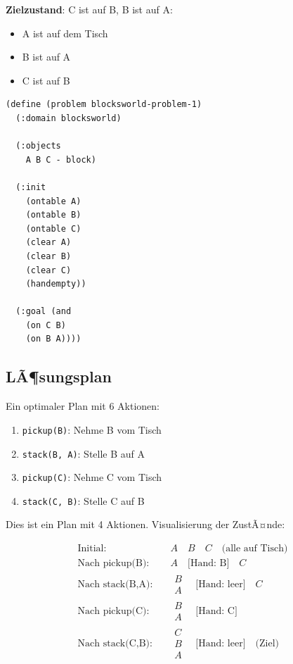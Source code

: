 ﻿\documentclass[a4paper,12pt]{article}
\theoremstyle{definition}
\begin{document}
\textbf{Zielzustand}: C ist auf B, B ist auf A:
\begin{itemize}
	\item[-] A ist auf dem Tisch
	\item[-] B ist auf A
	\item[-] C ist auf B
\end{itemize}

\begin{lstlisting}[language=PDDL, caption=Blocksworld Problem]
(define (problem blocksworld-problem-1)
  (:domain blocksworld)
  
  (:objects
    A B C - block)
  
  (:init
    (ontable A)
    (ontable B)
    (ontable C)
    (clear A)
    (clear B)
    (clear C)
    (handempty))
  
  (:goal (and
    (on C B)
    (on B A))))
\end{lstlisting}

\subsection{LÃ¶sungsplan}

Ein optimaler Plan mit 6 Aktionen:

\begin{enumerate}
	\item \texttt{pickup(B)}: Nehme B vom Tisch
	\item \texttt{stack(B, A)}: Stelle B auf A
	\item \texttt{pickup(C)}: Nehme C vom Tisch
	\item \texttt{stack(C, B)}: Stelle C auf B
\end{enumerate}

Dies ist ein Plan mit 4 Aktionen. Visualisierung der ZustÃ¤nde:

\begin{align*}
\text{Initial:} \quad & A \quad B \quad C \quad \text{(alle auf Tisch)} \\
\text{Nach pickup(B):} \quad & A \quad \text{[Hand: B]} \quad C \\
\text{Nach stack(B,A):} \quad & \begin{array}{c} B \\ A \end{array} \quad \text{[Hand: leer]} \quad C \\
\text{Nach pickup(C):} \quad & \begin{array}{c} B \\ A \end{array} \quad \text{[Hand: C]} \\
\text{Nach stack(C,B):} \quad & \begin{array}{c} C \\ B \\ A \end{array} \quad \text{[Hand: leer]} \quad \text{(Ziel)}
\end{align*}
\end{document}
